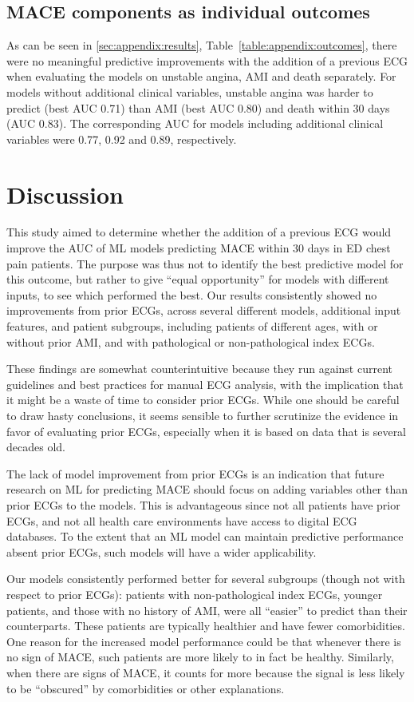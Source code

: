 \documentclass[preprint]{elsarticle}
\begin{document}
\subsection{MACE components as individual outcomes}
As can be seen in \ref{sec:appendix:results}, Table~\ref{table:appendix:outcomes}, there were no meaningful predictive improvements with the addition of a previous ECG when evaluating the models on unstable angina, AMI and death separately. For models without additional clinical variables, unstable angina was harder to predict (best AUC 0.71) than AMI (best AUC 0.80) and death within 30 days (AUC 0.83). The corresponding AUC for models including additional clinical variables were 0.77, 0.92 and 0.89, respectively. 

\section{Discussion}
This study aimed to determine whether the addition of a previous ECG would improve the AUC of ML models predicting MACE within 30 days in ED chest pain patients. The purpose was thus not to identify the best predictive model for this outcome, but rather to give ``equal opportunity'' for models with different inputs, to see which performed the best. Our results consistently showed no improvements from prior ECGs, across several different models, additional input features, and patient subgroups, including patients of different ages, with or without prior AMI, and with pathological or non-pathological index ECGs.

These findings are somewhat counterintuitive because they run against current guidelines and best practices for manual ECG analysis, with the implication that it might be a waste of time to consider prior ECGs. While one should be careful to draw hasty conclusions, it seems sensible to further scrutinize the evidence in favor of evaluating prior ECGs, especially when it is based on data that is several decades old.

The lack of model improvement from prior ECGs is an indication that future research on ML for predicting MACE should focus on adding variables other than prior ECGs to the models. This is advantageous since not all patients have prior ECGs, and not all health care environments have access to digital ECG databases. To the extent that an ML model can maintain predictive performance absent prior ECGs, such models will have a wider applicability.

Our models consistently performed better for several subgroups (though not with respect to prior ECGs): patients with non-pathological index ECGs, younger patients, and those with no history of AMI, were all ``easier'' to predict than their counterparts. These patients are typically healthier and have fewer comorbidities. One reason for the increased model performance could be that whenever there is no sign of MACE, such patients are more likely to in fact be healthy. Similarly, when there are signs of MACE, it counts for more because the signal is less likely to be ``obscured'' by comorbidities or other explanations.
\end{document}
